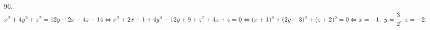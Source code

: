 96. $x^2+4y^2+z^2=12y-2x-4z-14\Leftrightarrow x^2+2x+1+4y^2-12y+9+z^2+4z+4=0\Leftrightarrow (x+1)^2+(2y-3)^2+(z+2)^2=0\Leftrightarrow
x=-1,\ y=\cfrac{3}{2},\ z=-2.$\\
